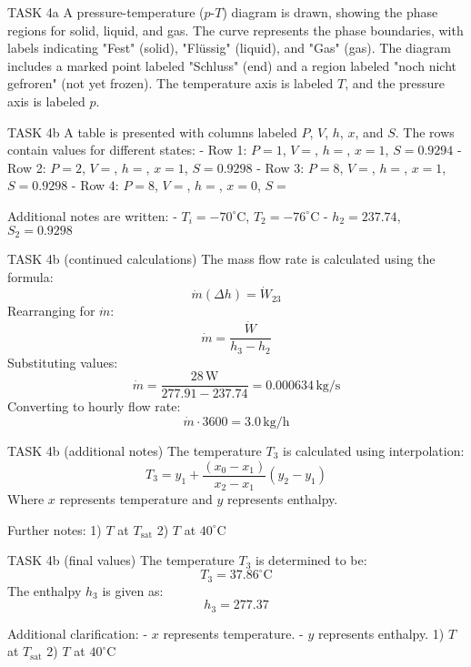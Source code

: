 TASK 4a  
A pressure-temperature (\( p \)-\( T \)) diagram is drawn, showing the phase regions for solid, liquid, and gas. The curve represents the phase boundaries, with labels indicating "Fest" (solid), "Flüssig" (liquid), and "Gas" (gas). The diagram includes a marked point labeled "Schluss" (end) and a region labeled "noch nicht gefroren" (not yet frozen). The temperature axis is labeled \( T \), and the pressure axis is labeled \( p \).  

TASK 4b  
A table is presented with columns labeled \( P \), \( V \), \( h \), \( x \), and \( S \). The rows contain values for different states:  
- Row 1: \( P = 1 \), \( V = \), \( h = \), \( x = 1 \), \( S = 0.9294 \)  
- Row 2: \( P = 2 \), \( V = \), \( h = \), \( x = 1 \), \( S = 0.9298 \)  
- Row 3: \( P = 8 \), \( V = \), \( h = \), \( x = 1 \), \( S = 0.9298 \)  
- Row 4: \( P = 8 \), \( V = \), \( h = \), \( x = 0 \), \( S = \)  

Additional notes are written:  
- \( T_i = -70^\circ\text{C} \), \( T_2 = -76^\circ\text{C} \)  
- \( h_2 = 237.74 \), \( S_2 = 0.9298 \)  

TASK 4b (continued calculations)  
The mass flow rate is calculated using the formula:  
\[
\dot{m} (\Delta h) = \dot{W}_{23}
\]  
Rearranging for \( \dot{m} \):  
\[
\dot{m} = \frac{\dot{W}}{h_3 - h_2}
\]  
Substituting values:  
\[
\dot{m} = \frac{28 \, \text{W}}{277.91 - 237.74} = 0.000634 \, \text{kg/s}
\]  
Converting to hourly flow rate:  
\[
\dot{m} \cdot 3600 = 3.0 \, \text{kg/h}
\]  

TASK 4b (additional notes)  
The temperature \( T_3 \) is calculated using interpolation:  
\[
T_3 = y_1 + \frac{(x_0 - x_1)}{x_2 - x_1} (y_2 - y_1)
\]  
Where \( x \) represents temperature and \( y \) represents enthalpy.  

Further notes:  
1) \( T \) at \( T_{\text{sat}} \)  
2) \( T \) at \( 40^\circ\text{C} \)  

TASK 4b (final values)  
The temperature \( T_3 \) is determined to be:  
\[
T_3 = 37.86^\circ\text{C}
\]  
The enthalpy \( h_3 \) is given as:  
\[
h_3 = 277.37
\]  

Additional clarification:  
- \( x \) represents temperature.  
- \( y \) represents enthalpy.  
1) \( T \) at \( T_{\text{sat}} \)  
2) \( T \) at \( 40^\circ\text{C} \)  